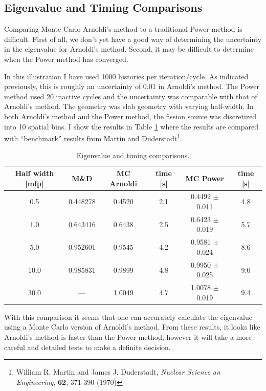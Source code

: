\documentclass[12pt]{article}
\begin{document}
\subsection{Eigenvalue and Timing Comparisons}
Comparing Monte Carlo Arnoldi's method to a traditional Power method is difficult.  First of all, we don't yet have a good way of determining the uncertainty in the eigenvalue for Arnoldi's method.  Second, it may be difficult to determine when the Power method has converged.  

In this illustration I have used 1000 histories per iteration/cycle.  As indicated previously, this is roughly an uncertainty of 0.01 in Arnoldi's method.  The Power method used 20 inactive cycles and the uncertainty was comparable with that of Arnoldi's method.  The geometry was slab geometry with varying half-width.  In both Arnoldi's method and the Power method, the fission source was discretized into 10 spatial bins.  I show the results in Table \ref{tbl:Timing} where the results are compared with ``benchmark'' results from Martin and Duderstadt\footnote{William R. Martin and James J. Duderstadt, \emph{Nuclear Science an Engineering}, \textbf{62}, 371-390 (1970)}.

\begin{table}[h]\centering
    \caption{Eigenvalue and timing comparisons.}
    \label{tbl:Timing}
    \vspace{11pt}
    \begin{tabular}{|c|c|c|c|c|c|} \hline
        Half width [mfp] & M\&D & MC Arnoldi & time [s] & MC Power & time [s] \\ \hline
        0.5  & 0.448278 & 0.4520 & 2.1 & 0.4492 $\pm$ 0.011 & 4.8  \\ \hline
        1.0  & 0.643416 & 0.6438 & 2.5 & 0.6423 $\pm$ 0.019 & 5.7  \\ \hline
        5.0  & 0.952601 & 0.9545 & 4.2 & 0.9581 $\pm$ 0.024 & 8.6  \\ \hline
        10.0 & 0.985831 & 0.9899 & 4.8 & 0.9950 $\pm$ 0.025 & 9.0  \\ \hline
        30.0 & ---      & 1.0049 & 4.7 & 1.0078 $\pm$ 0.019 & 9.4  \\ \hline
    \end{tabular}
\end{table}

With this comparison it seems that one can accurately calculate the eigenvalue using a Monte Carlo version of Arnoldi's method.  From these results, it looks like Arnoldi's method is faster than the Power method, however it will take a more careful and detailed tests to make a definite decision.
\end{document}
